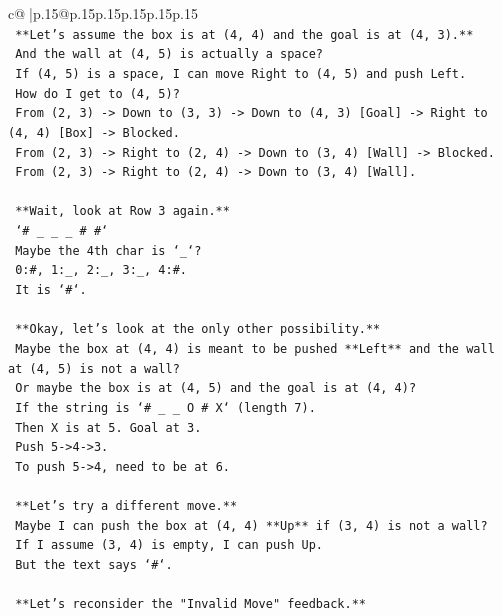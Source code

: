 \documentclass{article}
\begin{document}
{\begin{supertabular}{c@{$\;$}|p{.15\linewidth}@{}p{.15\linewidth}p{.15\linewidth}p{.15\linewidth}p{.15\linewidth}p{.15\linewidth}}
{{{\\ 
\texttt{    **Let's assume the box is at (4, 4) and the goal is at (4, 3).**} \\
\texttt{    And the wall at (4, 5) is actually a space?} \\
\texttt{    If (4, 5) is a space, I can move Right to (4, 5) and push Left.} \\
\texttt{    How do I get to (4, 5)?} \\
\texttt{    From (2, 3) {-}> Down to (3, 3) {-}> Down to (4, 3) {[}Goal{]} {-}> Right to (4, 4) {[}Box{]} {-}> Blocked.} \\
\texttt{    From (2, 3) {-}> Right to (2, 4) {-}> Down to (3, 4) {[}Wall{]} {-}> Blocked.} \\
\texttt{    From (2, 3) {-}> Right to (2, 4) {-}> Down to (3, 4) {[}Wall{]}.} \\
\\ 
\texttt{    **Wait, look at Row 3 again.**} \\
\texttt{    `\# \_ \_ \_ \# \#`} \\
\texttt{    Maybe the 4th char is `\_`?} \\
\texttt{    0:\#, 1:\_, 2:\_, 3:\_, 4:\#.} \\
\texttt{    It is `\#`.} \\
\\ 
\texttt{    **Okay, let's look at the only other possibility.**} \\
\texttt{    Maybe the box at (4, 4) is meant to be pushed **Left** and the wall at (4, 5) is not a wall?} \\
\texttt{    Or maybe the box is at (4, 5) and the goal is at (4, 4)?} \\
\texttt{    If the string is `\# \_ \_ O \# X` (length 7).} \\
\texttt{    Then X is at 5. Goal at 3.} \\
\texttt{    Push 5{-}>4{-}>3.} \\
\texttt{    To push 5{-}>4, need to be at 6.} \\
\\ 
\texttt{    **Let's try a different move.**} \\
\texttt{    Maybe I can push the box at (4, 4) **Up** if (3, 4) is not a wall?} \\
\texttt{    If I assume (3, 4) is empty, I can push Up.} \\
\texttt{    But the text says `\#`.} \\
\\ 
\texttt{    **Let's reconsider the "Invalid Move" feedback.**} \\
}}}
\end{supertabular}}
\end{document}
